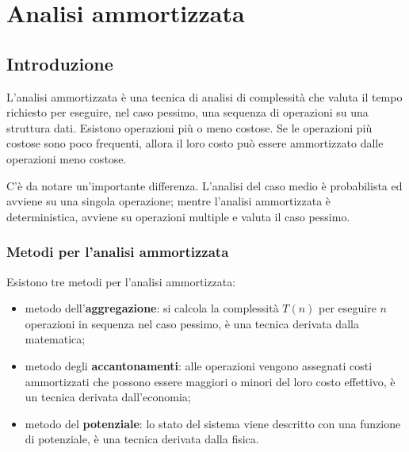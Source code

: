 
\ifsubfile
\usepackage{../settings/subfile}
\setcounter{chapter}{4}

\usepackage[newfloat, cachedir=_minted-cache, outputdir=../build]{minted}
\usepackage{../libraries/set-minted}

\usepackage{transparent}


\fi
\chapter{Analisi ammortizzata}

\section{Introduzione}

L'analisi ammortizzata è una tecnica di analisi di complessità che valuta il tempo richiesto per eseguire, nel caso pessimo, una sequenza di operazioni su una struttura dati.
Esistono operazioni più o meno costose.
Se le operazioni più costose sono poco frequenti, allora il loro costo può essere ammortizzato dalle operazioni meno costose.

C'è da notare un'importante differenza.
L'analisi del caso medio è probabilista ed avviene su una singola operazione; mentre l'analisi ammortizzata è deterministica, avviene su operazioni multiple e valuta il caso pessimo.

\subsection{Metodi per l'analisi ammortizzata}

Esistono tre metodi per l'analisi ammortizzata:
\begin{itemize}
    \item metodo dell'\textbf{aggregazione}: si calcola la complessità \(T(n)\) per eseguire \(n\) operazioni in sequenza nel caso pessimo, è una tecnica derivata dalla matematica;
    \item metodo degli \textbf{accantonamenti}: alle operazioni vengono assegnati costi ammortizzati che possono essere maggiori o minori del loro costo effettivo, è un tecnica derivata dall'economia;
    \item metodo del \textbf{potenziale}: lo stato del sistema viene descritto con una funzione di potenziale, è una tecnica derivata dalla fisica.
\end{itemize}

